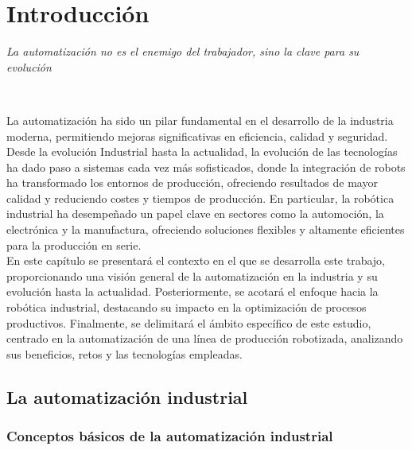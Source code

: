 \chapter{Introducción}
\label{cap:capitulo1}
\setcounter{page}{1}

\begin{flushright}
\begin{minipage}[]{10cm}
\emph{La automatización no es el enemigo del trabajador, sino la clave para su evolución}\\
\end{minipage}\\
\end{flushright}

\vspace{1cm}

La automatización ha sido un pilar fundamental en el desarrollo de la industria moderna, permitiendo mejoras significativas en eficiencia, calidad y seguridad. Desde la evolución Industrial hasta la actualidad, la evolución de las tecnologías ha dado paso a sistemas cada vez más sofisticados, donde la integración de robots ha transformado los entornos de producción, ofreciendo resultados de mayor calidad y reduciendo costes y tiempos de producción. En particular, la robótica industrial ha desempeñado un papel clave en sectores como la automoción, la electrónica y la manufactura, ofreciendo soluciones flexibles y altamente eficientes para la producción en serie.\\

En este capítulo se presentará el contexto en el que se desarrolla este trabajo, proporcionando una visión general de la automatización en la industria y su evolución hasta la actualidad. Posteriormente, se acotará el enfoque hacia la robótica industrial, destacando su impacto en la optimización de procesos productivos. Finalmente, se delimitará el ámbito específico de este estudio, centrado en la automatización de una línea de producción robotizada, analizando sus beneficios, retos y las tecnologías empleadas.

\section{La automatización industrial}
\label{sec:primeraseccion} %

\subsection{Conceptos básicos de la automatización industrial}

